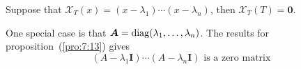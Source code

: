 \begin{proposition}\label{pro:7:13}
Suppose that $\mathcal{X}_T(x) = (x-\lambda_1)\cdots(x-\lambda_n)$, then $\mathcal{X}_T(T)=\bm0$.
\end{proposition}
\begin{remark}
One special case is that $\bm A = \operatorname{diag}(\lambda_1,\dots,\lambda_n)$.
The results for proposition~(\ref{pro:7:13}) gives
\[
(A-\lambda_1\bm I)\cdots(A-\lambda_n\bm I)\text{ is a zero matrix}
\]
\end{remark}

















